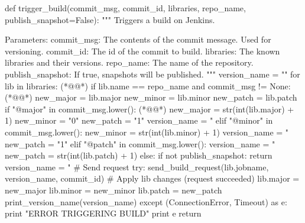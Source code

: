 \begin{pythoncode}[float=tbp,caption=Part of the Git hook responsible for setting library version names and triggering Jenkins (written in Python),label=lst:git_hook_trigger_build]
def trigger_build(commit_msg, commit_id, libraries, repo_name, publish_snapshot=False):
    """
    Triggers a build on Jenkins.

    Parameters:
        commit_msg:       The contents of the commit message. Used for versioning.
        commit_id:        The id of the commit to build.
        libraries:        The known libraries and their versions.
        repo_name:        The name of the repository.
        publish_snapshot: If true, snapshots will be published.
    """
    version_name = ""
    for lib in libraries: (*@\label{githook:13}@*)
        if lib.name == repo_name and commit_msg != None: (*@\label{githook:14}@*)
            new_major = lib.major
            new_minor = lib.minor
            new_patch = lib.patch
            if "@major" in commit_msg.lower(): (*@\label{githook:18}@*)
                new_major = str(int(lib.major) + 1)
                new_minor = "0"
                new_patch = "1"
                version_name = "%
            elif "@minor" in commit_msg.lower():
                new_minor = str(int(lib.minor) + 1)
                version_name = "%
                new_patch = "1"
            elif "@patch" in commit_msg.lower():
                version_name = "%
                new_patch = str(int(lib.patch) + 1)
            else:
                if not publish_snapshot:
                    return
                version_name = "%
            # Send request
            try:
                send_build_request(lib.jobname, version_name, commit_id)
                # Apply lib changes (request succeeded)
                lib.major = new_major
                lib.minor = new_minor
                lib.patch = new_patch
                print_version_name(version_name)
            except (ConnectionError, Timeout) as e:
                print "ERROR TRIGGERING BUILD"
                print e
            return
\end{pythoncode}

